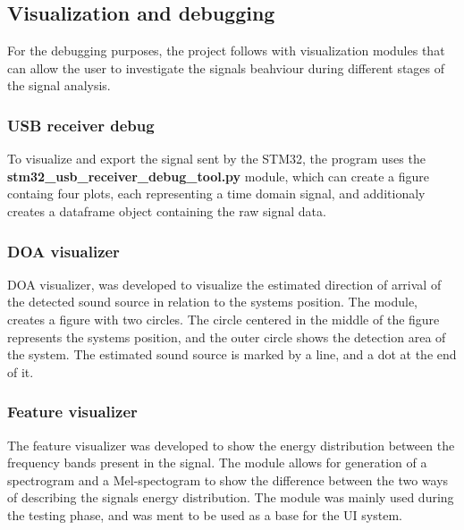 \subsection{Visualization and debugging}
For the debugging purposes, the project follows with visualization modules that can allow the user to investigate the signals beahviour during different stages of the signal analysis. 

    \subsubsection{USB receiver debug}
    To visualize and export the signal sent by the STM32, the program uses the \textbf{stm32\_usb\_receiver\_debug\_tool.py} module, which can create a figure containg four plots, each representing a time domain signal, and additionaly creates a dataframe object containing the raw signal data.
    
    \subsubsection{DOA visualizer}
    DOA visualizer, was developed to visualize the estimated direction of arrival of the detected sound source in relation to the systems position. The module, creates a figure with two circles. The circle centered in the middle of the figure represents the systems position, and the outer circle shows the detection area of the system. The estimated sound source is marked by a line, and a dot at the end of it.  
    
    \subsubsection{Feature visualizer}
    The feature visualizer was developed to show the energy distribution between the frequency bands present in the signal. The module allows for generation of a spectrogram and a Mel-spectogram to show the difference between the two ways of describing the signals energy distribution. The module was mainly used during the testing phase, and was ment to be used as a base for the UI system. 
 

